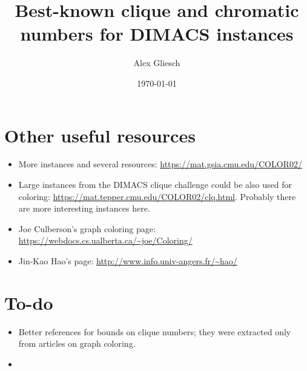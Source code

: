 \documentclass[a4paper,11pt]{article}
\begin{document}
\begin{landscape}


\title{Best-known clique and chromatic numbers for DIMACS instances}
\date{\today}
\author{Alex Gliesch}
\maketitle
\vspace{-0.5cm}

% 
% 

\end{landscape}

\section*{Other useful resources}

\begin{itemize}
  \item More instances and several resources: \url{https://mat.gsia.cmu.edu/COLOR02/}
  \item Large instances from the DIMACS clique challenge could be also used for coloring: \url{https://mat.tepper.cmu.edu/COLOR02/clq.html}. Probably there are more interesting instances here.
  \item Joe Culberson's graph coloring page: \url{https://webdocs.cs.ualberta.ca/~joe/Coloring/} 
  \item Jin-Kao Hao's page: \url{http://www.info.univ-angers.fr/~hao/}
\end{itemize}

\section*{To-do}

\begin{itemize}
  \item Better references for bounds on clique numbers; they were extracted only from articles on graph coloring.
  \item \textcite{Moalic2018}
\end{itemize}

\printbibliography

\iffalse 

\fi
\end{document}
